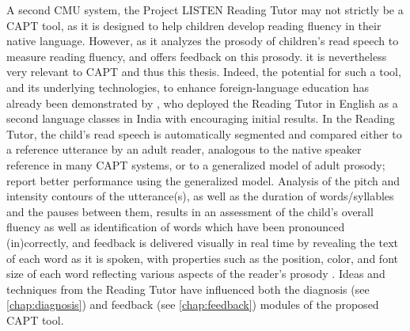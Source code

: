 	A second CMU system, the Project LISTEN Reading Tutor \citep{Mostow2012} 
may not strictly be a CAPT tool, as it 
is designed to help children develop reading fluency in their native language. 
However, as 
it analyzes the prosody of children's read speech to measure reading fluency, and offers feedback on this prosody. %
it is nevertheless very relevant to CAPT and thus this thesis. 
	Indeed, the potential for such a tool, and its underlying technologies, to enhance foreign-language education has already been demonstrated by , who deployed the Reading Tutor in English as a second language classes in India with encouraging initial results. 
	In the Reading Tutor, the child's read speech is automatically segmented and compared either to a reference utterance by an adult reader, analogous to the native speaker reference in many CAPT systems, or to a generalized model of adult prosody; \textcite{Duong2011} report better performance using the generalized model. Analysis of the pitch and intensity contours of the utterance(s), as well as the duration of words/syllables and the pauses between them, results in an assessment of the child's overall fluency as well as identification of words which have been pronounced (in)correctly, and feedback is delivered visually in real time by revealing the text of each word as it is spoken, with properties such as the position, color, and font size of each word reflecting various aspects of the reader's prosody \citep{Sitaram2011}. Ideas and techniques from the Reading Tutor have influenced both the diagnosis (see \cref{chap:diagnosis}) and feedback (see \cref{chap:feedback}) modules of the proposed CAPT tool. 
	
